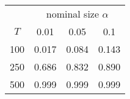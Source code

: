 % 
\begin{tabular}{cccc}
  \hline
  & \multicolumn{3}{c}{nominal size $\alpha$} \\
 $T$ & 0.01 & 0.05 & 0.1 \\
 \hline
100 & 0.017 & 0.084 & 0.143 \\ 
  250 & 0.686 & 0.832 & 0.890 \\ 
  500 & 0.999 & 0.999 & 0.999 \\ 
   \hline
\end{tabular}
